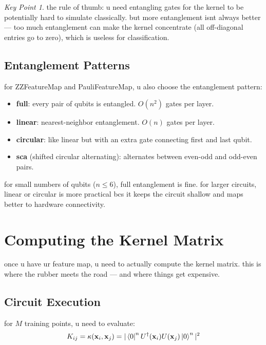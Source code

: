 \documentclass[11pt,a4paper]{article}
\theoremstyle{definition}
\theoremstyle{remark}
\newtheorem*{keypoint}{Key Point}
\begin{document}
\begin{keypoint}
the rule of thumb: u need entangling gates for the kernel to be potentially hard to simulate classically. but more entanglement isnt always better --- too much entanglement can make the kernel concentrate (all off-diagonal entries go to zero), which is useless for classification.
\end{keypoint}

\subsection{Entanglement Patterns}

for ZZFeatureMap and PauliFeatureMap, u also choose the entanglement pattern:

\begin{itemize}[leftmargin=*]
    \item \textbf{full}: every pair of qubits is entangled. $O(n^2)$ gates per layer.
    \item \textbf{linear}: nearest-neighbor entanglement. $O(n)$ gates per layer.
    \item \textbf{circular}: like linear but with an extra gate connecting first and last qubit.
    \item \textbf{sca} (shifted circular alternating): alternates between even-odd and odd-even pairs.
\end{itemize}

for small numbers of qubits ($n \leq 6$), full entanglement is fine. for larger circuits, linear or circular is more practical bcs it keeps the circuit shallow and maps better to hardware connectivity.

\section{Computing the Kernel Matrix}

once u have ur feature map, u need to actually compute the kernel matrix. this is where the rubber meets the road --- and where things get expensive.

\subsection{Circuit Execution}

for $M$ training points, u need to evaluate:
\[
K_{ij} = \kappa(\mathbf{x}_i, \mathbf{x}_j) = |\bra{0}^n U^\dagger(\mathbf{x}_i) U(\mathbf{x}_j) \ket{0}^n|^2
\]
\end{document}
